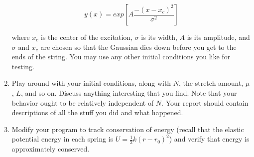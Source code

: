 \documentclass[12pt]{article}
\begin{document}
\begin{enumerate}
{$$y(x) = exp \left[ A \frac {-(x-x_c)^2}{\sigma^2} \right]$$

where $x_c$ is the center of the excitation, $\sigma$ is its width, $A$ is its amplitude, and $\sigma$ and $x_c$ are chosen so that
the Gaussian dies down before you get to the ends of the string. You may use any other initial conditions you like for testing.

}

  \item{Play around with your initial conditions, along with $N$, the stretch amount, $\mu$, $L$, and so on. Discuss anything interesting that you find. Note that your behavior ought to be relatively independent of $N$. Your report should contain 
descriptions of all the stuff you did and what happened.}

  \item{Modify your program to track conservation of energy (recall that the elastic potential energy in each spring is $U=\frac{1}{2}k(r-r_0)^2$) and verify that energy is approximately conserved.}

\end{enumerate}
\end{document}
